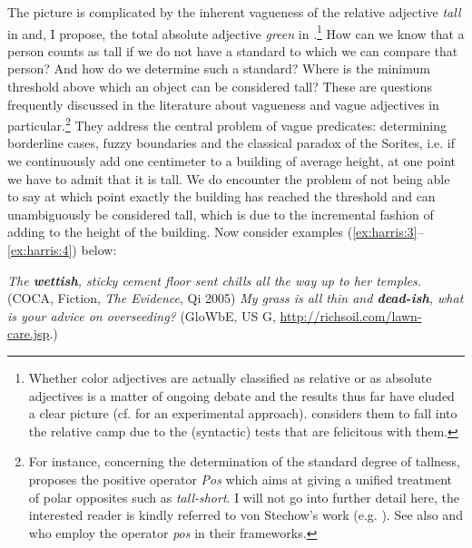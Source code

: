 \documentclass[output=paper]{langsci/langscibook}
\begin{document}
The picture is complicated by the inherent vagueness of the relative adjective  \textit{tall} in  and, I propose, the total absolute adjective  \textit{green} in .\footnote{Whether color adjectives are actually classified as relative or as absolute adjectives is a matter of ongoing debate and the results thus far have eluded a clear picture (cf. \citealt{Hansen2017} for an experimental approach). \citet{Burnett2012a, Burnett2012b} considers them to fall into the relative camp due to the (syntactic) tests that are felicitous with them.} How can we know that a person counts as tall if we do not have a standard to which we can compare that person? And how do we determine such a standard? Where is the minimum threshold above which an object can be considered tall? These are questions frequently discussed in the literature about vagueness and vague adjectives in particular.\footnote{For instance, concerning the determination of the standard degree of tallness, \citet {vonStechow1984} proposes the positive operator \textit{Pos} which aims at giving a unified treatment of polar opposites such as \textit{tall-short}. I will not go into further detail here, the interested reader is kindly referred to von Stechow's work (e.g. \citeyear{vonStechow1984,vonStechow2009}). See also \citet*{Kennedy2005} and \citet{Kennedy2007} who employ the operator \textit{pos} in their frameworks.} They address the central problem of vague predicates: determining borderline cases, fuzzy boundaries and the classical paradox of the Sorites, i.e. if we continuously add one centimeter to a building of average height, at one point we have to admit that it is tall. We do encounter the problem of not being able to say at which point exactly the building has reached the threshold and can unambiguously be considered tall, which is due to the incremental fashion of adding to the height of the building. Now consider examples (\ref{ex:harris:3}--\ref{ex:harris:4}) below:\largerpage[-2]

\ea\label{ex:harris:3}
	{\itshape The \textbf{wettish}, sticky cement floor sent chills all the way up to her temples.} (COCA, Fiction,  \textit{The Evidence}, Qi 2005)
\ex\label{ex:harris:4}
	{\itshape My grass is all thin and \textbf{dead-ish}, what is your advice on overseeding?} (GloWbE, US G, \url{http://richsoil.com/lawn-care.jsp}.)
\z
\end{document}
